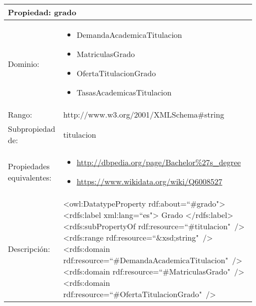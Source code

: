 \begin{table}[!ht]
	\centering
	\begin{tabular}{|p{}|p{}|}
		\hline
		\multicolumn{2}{|l|}{Propiedad: \textbf{grado}}
		\\ \hline
		Dominio:&
		\begin{itemize}
			\item DemandaAcademicaTitulacion
			\item MatriculasGrado
			\item OfertaTitulacionGrado
			\item TasasAcademicasTitulacion
		\end{itemize}
		\\ \hline
		Rango:&
		http://www.w3.org/2001/XMLSchema\#string
		\\ \hline
		Subpropiedad de:&
		titulacion
		\\ \hline
		Propiedades \newline equivalentes:&
		\begin{itemize}
			\item \url{http://dbpedia.org/page/Bachelor\%27s_degree}
			\item \url{https://www.wikidata.org/wiki/Q6008527}
		\end{itemize}
		\\ \hline
		Descripción:&
		\textless owl:DatatypeProperty rdf:about=``\#grado"\textgreater\newline 
		\tab\textless rdfs:label xml:lang=``es"\textgreater\newline
		\tab\tab Grado\newline
		\tab\textless /rdfs:label\textgreater\newline
		\tab\textless rdfs:subPropertyOf\newline
		\tab\tab rdf:resource=``\#titulacion"\ /\textgreater\newline
		\tab\textless rdfs:range\newline
		\tab\tab rdf:resource=``\&xsd;string"\ /\textgreater\newline
		\tab\textless rdfs:domain\newline
		\tab\tab rdf:resource=``\#DemandaAcademicaTitulacion"\ /\textgreater\newline
		\tab\textless rdfs:domain\newline
		\tab\tab rdf:resource=``\#MatriculasGrado"\ /\textgreater\newline
		\tab\textless rdfs:domain\newline
		\tab\tab rdf:resource=``\#OfertaTitulacionGrado"\ /\textgreater\newline

\end{tabular}
\end{table}

